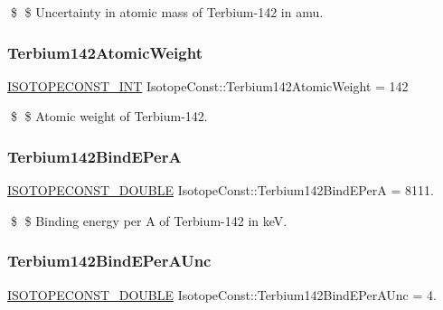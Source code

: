 \$ \$ Uncertainty in atomic mass of Terbium-\/142 in amu. \mbox{\label{group___isotope_const-_terbium-_tb142_gabc67dc486d8a7008443f9c5227557cab}} 
\subsubsection{\texorpdfstring{Terbium142\+Atomic\+Weight}{Terbium142AtomicWeight}}
{\footnotesize\ttfamily \mbox{\hyperlink{group___isotope_const-_macros_ga5f18360b3e99483a35c32d789e62621c}{I\+S\+O\+T\+O\+P\+E\+C\+O\+N\+S\+T\+\_\+\+I\+NT}} Isotope\+Const\+::\+Terbium142\+Atomic\+Weight = 142}

\$ \$ Atomic weight of Terbium-\/142. \mbox{\label{group___isotope_const-_terbium-_tb142_ga36fc6afe0d7f34ff8983c38190b695bf}} 
\subsubsection{\texorpdfstring{Terbium142\+Bind\+E\+PerA}{Terbium142BindEPerA}}
{\footnotesize\ttfamily \mbox{\hyperlink{group___isotope_const-_macros_ga8f45a7272ce02c0b4c65c44636ed719a}{I\+S\+O\+T\+O\+P\+E\+C\+O\+N\+S\+T\+\_\+\+D\+O\+U\+B\+LE}} Isotope\+Const\+::\+Terbium142\+Bind\+E\+PerA = 8111.}

\$ \$ Binding energy per A of Terbium-\/142 in keV. \mbox{\label{group___isotope_const-_terbium-_tb142_ga3665f199c2979a43a1675c5763b67e90}} 
\subsubsection{\texorpdfstring{Terbium142\+Bind\+E\+Per\+A\+Unc}{Terbium142BindEPerAUnc}}
{\footnotesize\ttfamily \mbox{\hyperlink{group___isotope_const-_macros_ga8f45a7272ce02c0b4c65c44636ed719a}{I\+S\+O\+T\+O\+P\+E\+C\+O\+N\+S\+T\+\_\+\+D\+O\+U\+B\+LE}} Isotope\+Const\+::\+Terbium142\+Bind\+E\+Per\+A\+Unc = 4.}

